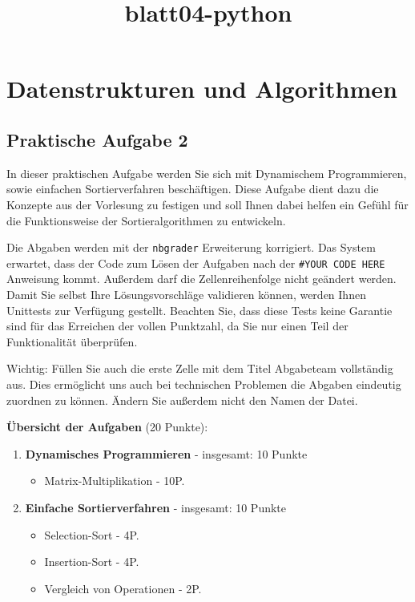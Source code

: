 \documentclass[11pt]{article}
\title{blatt04-python}
\providecommand{\tightlist}{%
      \setlength{\itemsep}{0pt}\setlength{\parskip}{0pt}}
\begin{document}
    
    \maketitle
    
    

    
    \hypertarget{datenstrukturen-und-algorithmen}{%
\section{Datenstrukturen und
Algorithmen}\label{datenstrukturen-und-algorithmen}}

\hypertarget{praktische-aufgabe-2}{%
\subsection{Praktische Aufgabe 2}\label{praktische-aufgabe-2}}

In dieser praktischen Aufgabe werden Sie sich mit Dynamischem
Programmieren, sowie einfachen Sortierverfahren beschäftigen. Diese
Aufgabe dient dazu die Konzepte aus der Vorlesung zu festigen und soll
Ihnen dabei helfen ein Gefühl für die Funktionsweise der
Sortieralgorithmen zu entwickeln.

Die Abgaben werden mit der \texttt{nbgrader} Erweiterung korrigiert. Das
System erwartet, dass der Code zum Lösen der Aufgaben nach der
\texttt{\#YOUR\ CODE\ HERE} Anweisung kommt. Außerdem darf die
Zellenreihenfolge nicht geändert werden. Damit Sie selbst Ihre
Lösungsvorschläge validieren können, werden Ihnen Unittests zur
Verfügung gestellt. Beachten Sie, dass diese Tests keine Garantie sind
für das Erreichen der vollen Punktzahl, da Sie nur einen Teil der
Funktionalität überprüfen.

Wichtig: Füllen Sie auch die erste Zelle mit dem Titel Abgabeteam
vollständig aus. Dies ermöglicht uns auch bei technischen Problemen die
Abgaben eindeutig zuordnen zu können. Ändern Sie außerdem nicht den
Namen der Datei.

\textbf{Übersicht der Aufgaben} (20 Punkte):

\begin{enumerate}
\def\labelenumi{\arabic{enumi}.}
\tightlist
\item
  \textbf{Dynamisches Programmieren} - insgesamt: 10 Punkte

  \begin{itemize}
  \tightlist
  \item
    Matrix-Multiplikation - 10P.
  \end{itemize}
\item
  \textbf{Einfache Sortierverfahren} - insgesamt: 10 Punkte

  \begin{itemize}
  \tightlist
  \item
    Selection-Sort - 4P.
  \item
    Insertion-Sort - 4P.
  \item
    Vergleich von Operationen - 2P.
  \end{itemize}
\end{enumerate}
\end{document}
